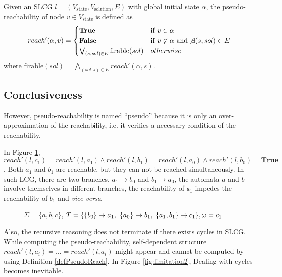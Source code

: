 \begin{definition}\label{defPseudoReach}
Given an SLCG $l=(V_{\mathrm{state}},V_{\mathrm{solution}},E)$ with global initial state $\alpha$, the pseudo-reachability of node $v\in V_{\mathrm{state}}$ is defined as
\begin{equation}
\nonumber
    reach'(\alpha,v)=
    \begin{cases}
        \mathrm{\bf True} & {\rm if\ } v\in \alpha\\
        \mathrm{\bf False} & {\rm if\ } v\not\in \alpha\ {\rm and} \not\exists(s,sol) \in E\\
        \bigvee_{(s,sol) \in E} \mathrm{firable}(sol) & otherwise
    \end{cases}
\end{equation}
where $\mathrm{firable}(sol)=\bigwedge_{(sol,s)\in E} reach'(\alpha,s)$. 

\end{definition}

\subsection{Conclusiveness}\label{sec:conclusiveness}
However, pseudo-reachability is named ``pseudo'' because it is only an over-approximation of the reachability, i.e. it verifies a necessary condition of the reachability.
\begin{example}\label{example:unreach}
    In Figure \ref{fig:limitation}, $reach'(l,c_1)=reach'(l,a_1)\land reach'(l,b_1)=reach'(l,a_0)\land reach'(l,b_0)=\textbf{True}$. Both $a_1$ and $b_1$ are reachable, but they can not be reached simultaneously.
    In such LCG, there are two branches, $a_1\to b_0$ and $b_1\to a_0$, the automata $a$ and $b$ involve themselves in different branches, the reachability of $a_1$ impedes the reachability of $b_1$ and \textit{vice versa}.
\end{example}

\begin{figure}[ht]
    \centering
    
    \caption[Limitation of SLCG 1]{$\Sigma=\{a,b,c\}$, $T=\{\acm{b_0}{a_0}{a_1},\ \acm{a_0}{b_0}{b_1},\ \acm{a_1,b_1}{c_0}{c_1}\},\omega=c_1$}
    \label{fig:limitation}
\end{figure}

Also, the recursive reasoning does not terminate if there exists cycles in SLCG. 
While computing the pseudo-reachability, self-dependent structure  $reach'(l,a_i)=\ldots=reach'(l,a_i)$ might appear and cannot be computed by using Definition \ref{defPseudoReach}. 
In Figure \ref{fig:limitation2}, 
Dealing with cycles becomes inevitable.

